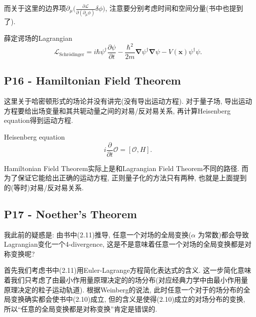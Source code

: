 而关于这里的边界项$\partial_\mu \bigl(\frac{\partial \mathcal{L}}{\partial(\partial_\mu \phi)}\delta \phi \bigr)$, 注意要分别考虑时间和空间分量(书中也提到了).
\begin{mybox}{薛定谔场的Lagrangian}
  \begin{equation}
    \mathcal{L}_\text{Schrödinger} = i\hbar\psi^\dagger\frac{\partial \psi}{\partial t} - \frac{\hbar^2}{2m}\bm{\nabla}\psi^\dagger\bm{\nabla}\psi - V(\mathbf x)\psi^\dagger\psi.
  \end{equation}
\end{mybox}

\subsection{P16 - Hamiltonian Field Theorem}

这里关于哈密顿形式的场论并没有讲完(没有导出运动方程).
对于量子场, 导出运动方程要给出场变量和其共轭动量之间的对易/反对易关系, 再计算Heisenberg equation得到运动方程.
\begin{mybox}{Heisenberg equation}
  \begin{equation}
    i\frac{\partial}{\partial t}\mathcal{O} = [\mathcal{O}, H].
  \end{equation}
\end{mybox}


Hamiltonian Field Theorem实际上是和Lagrangian Field Theorem不同的路径.
而为了保证它能给出正确的运动方程, 正则量子化的方法只有两种, 也就是上面提到的(等时)对易/反对易关系.

\subsection{P17 - Noether's Theorem}

我此前的疑惑是: 由书中(2.11)推导, 任意一个对场的全局变换($\alpha$ 为常数)都会导致Lagrangian变化一个4-divergence, 这是不是意味着任意一个对场的全局变换都是对称变换呢?

首先我们考虑书中(2.11)用Euler-Lagrange方程简化表达式的含义.
这一步简化意味着我们只考虑了由最小作用量原理决定的的场分布(对应经典力学中由最小作用量原理决定的粒子运动轨道).
根据Weinberg的说法, 此时任意一个对于的场分布的全局变换确实都会使书中(2.10)成立, 但的含义是使得(2.10)成立的对场分布的变换, 所以“任意的全局变换都是对称变换”肯定是错误的.

